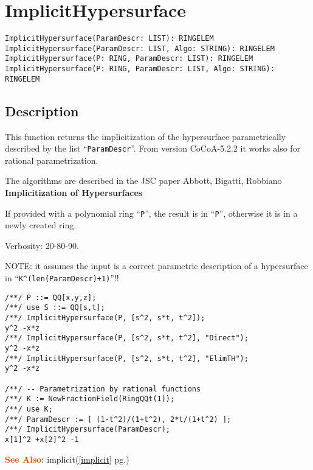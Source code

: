 \documentclass[a4paper]{mybook}
\newenvironment{command}{}{} %
\newcommand\SeeAlso{\par\textcolor{OrangeRed}{\textbf{\large See Also: }}}
\begin{document}
\section{ImplicitHypersurface}
\label{ImplicitHypersurface}
\begin{command} %


\begin{Verbatim}[label=syntax, rulecolor=\color{MidnightBlue},
frame=single]
ImplicitHypersurface(ParamDescr: LIST): RINGELEM
ImplicitHypersurface(ParamDescr: LIST, Algo: STRING): RINGELEM
ImplicitHypersurface(P: RING, ParamDescr: LIST): RINGELEM
ImplicitHypersurface(P: RING, ParamDescr: LIST, Algo: STRING): RINGELEM
\end{Verbatim}


\subsection*{Description}

This function returns the implicitization of the hypersurface
parametrically described by the list ``\verb&ParamDescr&''.
From version CoCoA-5.2.2 it works also for rational parametrization.
\par 
The algorithms are described in the JSC paper Abbott, Bigatti, Robbiano
\textbf{Implicitization of Hypersurfaces}
\par 
If provided with a polynomial ring ``\verb&P&'', the result is in ``\verb&P&'',
otherwise it is in a newly created ring.
\par 
Verbosity: 20-80-90.
\par 
NOTE: it assumes the input is a correct parametric description of a
hypersurface in ``\verb&K^(len(ParamDescr)+1)&''!! 
\begin{Verbatim}[label=example, rulecolor=\color{PineGreen}, frame=single]
/**/ P ::= QQ[x,y,z];
/**/ use S ::= QQ[s,t];
/**/ ImplicitHypersurface(P, [s^2, s*t, t^2]);
y^2 -x*z
/**/ ImplicitHypersurface(P, [s^2, s*t, t^2], "Direct");
y^2 -x*z
/**/ ImplicitHypersurface(P, [s^2, s*t, t^2], "ElimTH");
y^2 -x*z

/**/ -- Parametrization by rational functions
/**/ K := NewFractionField(RingQQt(1));
/**/ use K;
/**/ ParamDescr := [ (1-t^2)/(1+t^2), 2*t/(1+t^2) ];
/**/ ImplicitHypersurface(ParamDescr);
x[1]^2 +x[2]^2 -1
\end{Verbatim}


\SeeAlso %
  implicit(\ref{implicit} pg.\pageref{implicit})
\end{command} %
\end{document}
